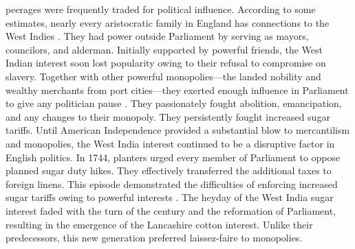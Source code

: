 peerages were frequently traded for political influence. According to some estimates, nearly every aristocratic family in England has connections to the West Indies . They had power outside Parliament by serving as mayors, councilors, and alderman. Initially supported by powerful friends, the West Indian interest soon lost popularity owing to their refusal to compromise on slavery. Together with other powerful monopolies—the landed nobility and wealthy merchants from port cities—they exerted enough influence in Parliament to give any politician pause . They passionately fought abolition, emancipation, and any changes to their monopoly. They persistently fought increased sugar tariffs. Until American Independence provided a substantial blow to mercantilism and monopolies, the West India interest continued to be a disruptive factor in English politics. In 1744, planters urged every member of Parliament to oppose planned sugar duty hikes. They effectively transferred the additional taxes to foreign linens. This episode demonstrated the difficulties of enforcing increased sugar tariffs owing to powerful interests . The heyday of the West India sugar interest faded with the turn of the century and the reformation of Parliament, resulting in the emergence of the Lancashire cotton interest. Unlike their predecessors, this new generation preferred laissez-faire to monopolies.